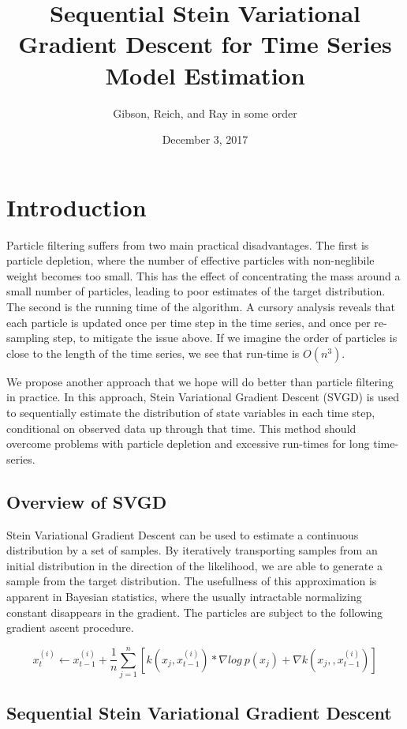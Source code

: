 \documentclass[]{article}
\title{Sequential Stein Variational Gradient Descent for Time Series Model
Estimation}
\author{Gibson, Reich, and Ray in some order}
\date{December 3, 2017}
\begin{document}
\maketitle

\section{Introduction}\label{introduction}

Particle filtering suffers from two main practical disadvantages. The
first is particle depletion, where the number of effective particles
with non-neglibile weight becomes too small. This has the effect of
concentrating the mass around a small number of particles, leading to
poor estimates of the target distribution. The second is the running
time of the algorithm. A cursory analysis reveals that each particle is
updated once per time step in the time series, and once per re-sampling
step, to mitigate the issue above. If we imagine the order of particles
is close to the length of the time series, we see that run-time is
\(O(n^3)\).

We propose another approach that we hope will do better than particle
filtering in practice. In this approach, Stein Variational Gradient
Descent (SVGD) is used to sequentially estimate the distribution of
state variables in each time step, conditional on observed data up
through that time. This method should overcome problems with particle
depletion and excessive run-times for long time-series.

\subsection{Overview of SVGD}\label{overview-of-svgd}

Stein Variational Gradient Descent can be used to estimate a continuous
distribution by a set of samples. By iteratively transporting samples
from an initial distribution in the direction of the likelihood, we are
able to generate a sample from the target distribution. The usefullness
of this approximation is apparent in Bayesian statistics, where the
usually intractable normalizing constant disappears in the gradient. The
particles are subject to the following gradient ascent procedure.

\[x_t^{(i)} \leftarrow x_{t-1}^{(i)} + \frac{1}{n}\sum_{j=1}^n[ k(x_j,x_{t-1}^{(i)})*\nabla log\ p(x_j) + \nabla k(x_j,,x_{t-1}^{(i)})]\]

\subsection{Sequential Stein Variational Gradient
Descent}\label{sequential-stein-variational-gradient-descent}
\end{document}
